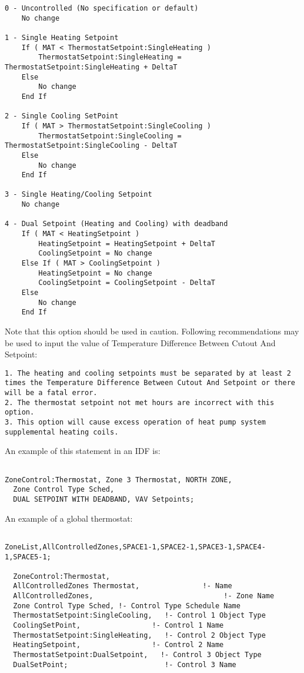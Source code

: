 \begin{lstlisting}
0 - Uncontrolled (No specification or default)
	No change

1 - Single Heating Setpoint
	If ( MAT < ThermostatSetpoint:SingleHeating )
		ThermostatSetpoint:SingleHeating = ThermostatSetpoint:SingleHeating + DeltaT
	Else
		No change
	End If

2 - Single Cooling SetPoint
	If ( MAT > ThermostatSetpoint:SingleCooling )
		ThermostatSetpoint:SingleCooling = ThermostatSetpoint:SingleCooling - DeltaT
	Else
		No change
	End If

3 - Single Heating/Cooling Setpoint
	No change

4 - Dual Setpoint (Heating and Cooling) with deadband
	If ( MAT < HeatingSetpoint )
		HeatingSetpoint = HeatingSetpoint + DeltaT
		CoolingSetpoint = No change
	Else If ( MAT > CoolingSetpoint )
		HeatingSetpoint = No change
		CoolingSetpoint = CoolingSetpoint - DeltaT
	Else
		No change
	End If
\end{lstlisting}

Note that this option should be used in caution. Following recommendations may be used to input the value of Temperature Difference Between Cutout And Setpoint:

\begin{lstlisting}
1. The heating and cooling setpoints must be separated by at least 2 times the Temperature Difference Between Cutout And Setpoint or there will be a fatal error.
2. The thermostat setpoint not met hours are incorrect with this option.
3. This option will cause excess operation of heat pump system supplemental heating coils.

\end{lstlisting}

An example of this statement in an IDF is:

\begin{lstlisting}

ZoneControl:Thermostat, Zone 3 Thermostat, NORTH ZONE,
  Zone Control Type Sched,
  DUAL SETPOINT WITH DEADBAND, VAV Setpoints;
\end{lstlisting}

An example of a global thermostat:

\begin{lstlisting}

ZoneList,AllControlledZones,SPACE1-1,SPACE2-1,SPACE3-1,SPACE4-1,SPACE5-1;

  ZoneControl:Thermostat,
  AllControlledZones Thermostat,               !- Name
  AllControlledZones,                               !- Zone Name
  Zone Control Type Sched, !- Control Type Schedule Name
  ThermostatSetpoint:SingleCooling,   !- Control 1 Object Type
  CoolingSetPoint,                 !- Control 1 Name
  ThermostatSetpoint:SingleHeating,   !- Control 2 Object Type
  HeatingSetpoint,                 !- Control 2 Name
  ThermostatSetpoint:DualSetpoint,   !- Control 3 Object Type
  DualSetPoint;                       !- Control 3 Name
\end{lstlisting}

